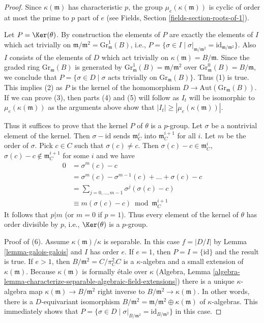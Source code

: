 \begin{proof}
\medskip\noindent
Since $\kappa(\mathfrak m)$ has characteristic $p$, the group
$\mu_e(\kappa(\mathfrak m))$ is cyclic of order at most the prime
to $p$ part of $e$ (see Fields, Section \ref{fields-section-roots-of-1}).

\medskip\noindent
Let $P = \Ker(\theta)$. By construction the elements of $P$ are exactly
the elements of $I$ which act trivially on
$\mathfrak m/\mathfrak m^2 = \text{Gr}_\mathfrak m^1(B)$,
i.e., $P = \{\sigma \in I \mid \sigma|_{\mathfrak m/\mathfrak m^2} =
\text{id}_{\mathfrak m/\mathfrak m^2}\}$. Also
$I$ consists of the elements of $D$ which act trivially on
$\kappa(\mathfrak m) = B/\mathfrak m$.
Since the graded ring $\text{Gr}_\mathfrak m(B)$ is generated
by $\text{Gr}^1_\mathfrak m(B) = \mathfrak m/\mathfrak m^2$ over
$\text{Gr}^0_\mathfrak m(B) = B/\mathfrak m$, we conclude that
$P = \{\sigma \in D \mid \sigma \text{ acts trivially on }
\text{Gr}_\mathfrak m(B)\}$.
Thus (1) is true. This implies (2) as $P$ is the kernel
of the homomorphism $D \to \text{Aut}(\text{Gr}_\mathfrak m(B))$.
If we can prove (3), then parts (4) and (5) will follow as $I_t$
will be isomorphic to $\mu_e(\kappa(\mathfrak m))$ as the arguments above show
that $|I_t| \geq |\mu_e(\kappa(\mathfrak m))|$.

\medskip\noindent
Thus it suffices to prove that the
kernel $P$ of $\theta$ is a $p$-group.
Let $\sigma$ be a nontrivial element of the kernel. Then $\sigma - \text{id}$
sends $\mathfrak m_C^i$ into $\mathfrak m_C^{i + 1}$
for all $i$. Let $m$ be the order of $\sigma$. Pick $c \in C$ such
that $\sigma(c) \not = c$. Then $\sigma(c) - c \in \mathfrak m_C^i$,
$\sigma(c) - c \not \in \mathfrak m_C^{i + 1}$ for some $i$ and
we have
\begin{align*}
0
& =
\sigma^m(c) - c \\
& =
\sigma^m(c) - \sigma^{m - 1}(c) + \ldots + \sigma(c) - c \\
& =
\sum\nolimits_{j = 0, \ldots, m - 1} \sigma^j(\sigma(c) - c) \\
& \equiv
m(\sigma(c) - c) \bmod \mathfrak m_C^{i + 1}
\end{align*}
It follows that $p | m$ (or $m = 0$ if $p = 1$). Thus every element of the
kernel of $\theta$ has order divisible by $p$, i.e., $\Ker(\theta)$
is a $p$-group.

\medskip\noindent
Proof of (6). Assume $\kappa(\mathfrak m)/\kappa$ is separable.
In this case $f = |D/I|$ by Lemma \ref{lemma-galois-galois}
and $I$ has order $e$. If $e = 1$, then $P = I = \{\text{id}\}$
and the result is true. If $e > 1$, then
$B/\mathfrak m^2 = C/\pi_C^2C$ is a $\kappa$-algebra
and a small extension of $\kappa(\mathfrak m)$.
Because $\kappa(\mathfrak m)$ is formally \'etale over $\kappa$
(Algebra, Lemma
\ref{algebra-lemma-characterize-separable-algebraic-field-extensions})
there is a unique $\kappa$-algebra map
$\kappa(\mathfrak m) \to B/\mathfrak m^2$
right inverse to $B/\mathfrak m^2 \to \kappa(\mathfrak m)$.
In other words, there is a $D$-equivariant isomorphism
$B/\mathfrak m^2 = \mathfrak m/\mathfrak m^2 \oplus \kappa(\mathfrak m)$
of $\kappa$-algebras. This immediately shows that
$P =
\{\sigma \in D \mid \sigma|_{B/\mathfrak m^2} = \text{id}_{B/\mathfrak m^2}\}$
in this case.
\end{proof}